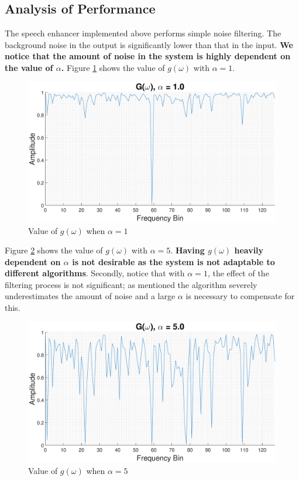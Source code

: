 \documentclass[a4paper,pra,twocolumn,10pt,aps,longbibliography,nobalancelastpage]{revtex4-1}
\begin{document}
\subsection{Analysis of Performance}\label{sec:analysis_of_performance}
The speech enhancer implemented above performs simple noise filtering. The background noise in the output is significantly lower than that in the input. \textbf{We notice that the amount of noise in the system is highly dependent on the value of $\alpha$.} Figure \ref{fig:g_w_alpha_1} shows the value of $g(\omega)$ with $\alpha=1$. 

\begin{figure}[H]
	\centering
	\includegraphics[width=\columnwidth]{g_w_alpha_1}
  	\caption{Value of $g(\omega)$ when $\alpha=1$}
	\label{fig:g_w_alpha_1}
\end{figure}

Figure \ref{fig:g_w_alpha_2} shows the value of $g(\omega)$ with $\alpha=5$. \textbf{Having $g(\omega)$ heavily dependent on $\alpha$ is not desirable as the system is not adaptable to different algorithms}. Secondly, notice that with $\alpha = 1$, the effect of the filtering process is not significant; as mentioned the algorithm severely underestimates the amount of noise and a large $\alpha$ is necessary to compensate for this.

\begin{figure}[H]
	\centering
    \includegraphics[width=\columnwidth]{g_w_alpha_5}
  	\caption{Value of $g(\omega)$ when $\alpha=5$}
	\label{fig:g_w_alpha_2}
\end{figure}	
\end{document}
